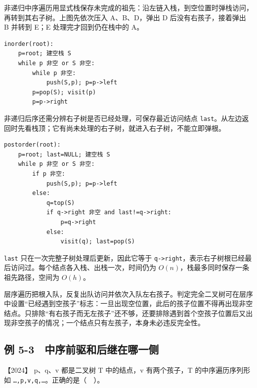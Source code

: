 非递归中序遍历用显式栈保存未完成的祖先：沿左链入栈，到空位置时弹栈访问，再转到其右子树。上图先依次压入 A、B、D，弹出 D 后没有右孩子，接着弹出 B 并转到 E；E 处理完才回到仍在栈中的 A。

\par\medskip\noindent
\begin{minipage}{\linewidth}
\begin{verbatim}
inorder(root):
    p=root; 建空栈 S
    while p 非空 or S 非空:
        while p 非空:
            push(S,p); p=p->left
        p=pop(S); visit(p)
        p=p->right
\end{verbatim}
\end{minipage}\par\medskip

非递归后序还需分辨右子树是否已经处理，可保存最近访问结点 \texttt{last}。从左边返回时先看栈顶；它有尚未处理的右子树，就进入右子树，不能立即弹根。

\par\medskip\noindent
\begin{minipage}{\linewidth}
\begin{verbatim}
postorder(root):
    p=root; last=NULL; 建空栈 S
    while p 非空 or S 非空:
        if p 非空:
            push(S,p); p=p->left
        else:
            q=top(S)
            if q->right 非空 and last!=q->right:
                p=q->right
            else:
                visit(q); last=pop(S)
\end{verbatim}
\end{minipage}\par\medskip

\texttt{last} 只在一次完整子树处理后更新，因此它等于 \texttt{q-\textgreater{}right}，表示右子树根已经最后访问过。每个结点各入栈、出栈一次，时间仍为 \(O(n)\)，栈最多同时保存一条祖先路径，空间为 \(O(h)\)。

层序遍历把根入队，反复出队访问并依次入队左右孩子。判定完全二叉树可在层序中设置``已经遇到空孩子''标志：一旦出现空位置，此后的孩子位置不得再出现非空结点。只排除``有右孩子而无左孩子''还不够，还要排除遇到首个空孩子位置后又出现非空孩子的情况；一个结点只有左孩子，本身未必违反完全性。

\subsection{例 5-3　中序前驱和后继在哪一侧}\label{ds-ex5-3}

\noindent{}【2024】 p、q、v 都是二叉树 T 中的结点，v 有两个孩子，T 的中序遍历序列形如 \texttt{…,}\allowbreak{}\texttt{p,}\allowbreak{}\texttt{v,}\allowbreak{}\texttt{q,}\allowbreak{}\texttt{…}。正确的是（　）。

